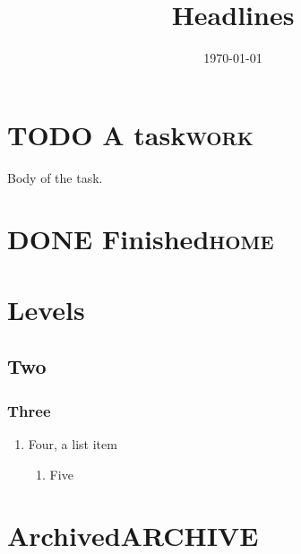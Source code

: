 \documentclass[11pt]{article}
\date{\today}
\title{Headlines}
\begin{document}
\maketitle
\tableofcontents

\section{{\bfseries\sffamily TODO} A task\hfill{}\textsc{work}}
\label{sec:org7bfd295}
Body of the task.
\section{{\bfseries\sffamily DONE} Finished\hfill{}\textsc{home}}
\label{sec:org1c59b52}
\section{Levels}
\label{sec:org3028fdc}
\subsection{Two}
\label{sec:org0e4d337}
\subsubsection{Three}
\label{sec:org1f85fd9}
\begin{enumerate}
\item Four, a list item
\label{sec:org47118c0}
\begin{enumerate}
\item Five
\label{sec:orgaf3ed89}
\end{enumerate}
\end{enumerate}
\section{Archived\hfill{}\textsc{ARCHIVE}}
\label{sec:org0af2b60}
\end{document}
